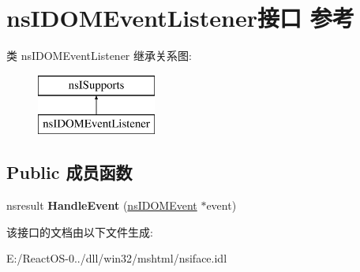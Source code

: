 \hypertarget{interfacens_i_d_o_m_event_listener}{}\section{ns\+I\+D\+O\+M\+Event\+Listener接口 参考}
\label{interfacens_i_d_o_m_event_listener}
类 ns\+I\+D\+O\+M\+Event\+Listener 继承关系图\+:\begin{figure}[H]
\begin{center}
\leavevmode
\includegraphics[height=2.000000cm]{interfacens_i_d_o_m_event_listener}
\end{center}
\end{figure}
\subsection*{Public 成员函数}
\begin{DoxyCompactItemize}
\item 
\mbox{\label{interfacens_i_d_o_m_event_listener_a225ba0f4b7d992c81247b1c99d56655a}} 
nsresult {\bfseries Handle\+Event} (\hyperlink{interfacens_i_d_o_m_event}{ns\+I\+D\+O\+M\+Event} $\ast$event)
\end{DoxyCompactItemize}


该接口的文档由以下文件生成\+:\begin{DoxyCompactItemize}
\item 
E\+:/\+React\+O\+S-\/0../dll/win32/mshtml/nsiface.\+idl\end{DoxyCompactItemize}
